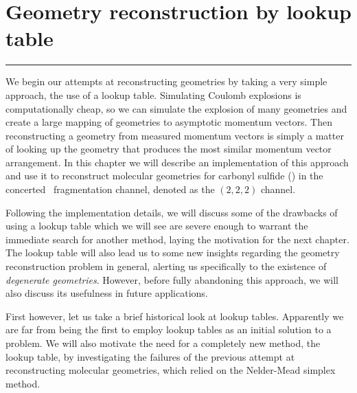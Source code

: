 \chapter{Geometry reconstruction by lookup table}\label{ch:lookupTable}

\vspace{-1.5 em}
\begin{addmargin}[-0.5cm]{0cm}
  \minitoc
\end{addmargin}
\hrule
\vspace{1.5 em}

\noindent
We begin our attempts at reconstructing geometries by taking a very simple approach, the use of a lookup table. Simulating Coulomb explosions is computationally cheap, so we can simulate the explosion of many geometries and create a large mapping of geometries to asymptotic momentum vectors. Then reconstructing a geometry from measured momentum vectors is simply a matter of looking up the geometry that produces the most similar momentum vector arrangement. In this chapter we will describe an implementation of this approach and use it to reconstruct molecular geometries for carbonyl sulfide () in the  concerted\footnotemark~ fragmentation channel, denoted as the $(2,2,2)$ channel.


Following the implementation details, we will discuss some of the drawbacks of using a lookup table which we will see are severe enough to warrant the immediate search for another method, laying the motivation for the next chapter. The lookup table will also lead us to some new insights regarding the geometry reconstruction problem in general, alerting us specifically to the existence of \emph{degenerate geometries}. However, before fully abandoning this approach, we will also discuss its usefulness in future applications.

First however, let us take a brief historical look at lookup tables. Apparently we are far from being the first to employ lookup tables as an initial solution to a problem. We will also motivate the need for a completely new method, the lookup table, by investigating the failures of the previous attempt at reconstructing molecular geometries, which relied on the Nelder-Mead simplex method.

